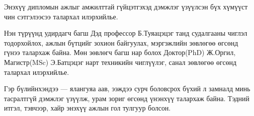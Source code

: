 
\begin{acknowledgements}
\addchaptertocentry{\acknowledgementname}

Энэхүү дипломын ажлыг амжилттай гүйцэтгэхэд дэмжлэг үзүүлсэн бүх хүмүүст чин сэтгэлээсээ талархал илэрхийлье.

Нэн түрүүнд удирдагч багш Дэд профессор Б.Туяацэцэг танд судалгааны чиглэл тодорхойлох, ажлын бүтцийг зохион байгуулах, мэргэжлийн зөвлөгөө өгсөнд гүнээ талархаж байна. Мөн зөвлөгч багш нар болох Доктор(PhD) Ж.Оргил, Магистр(MSc) Э.Батцэцэг нарт техникийн чиглүүлэг, санал зөвлөгөө өгсөнд талархал илэрхийлье.

Гэр бүлийнхэндээ --- ялангуяа аав, ээждээ сурч боловсрох бүхий л замналд минь тасралтгүй дэмжлэг үзүүлж, урам зориг өгсөнд үнэнхүү талархаж байна. Тэдний итгэл, тэвчээр, хайр энэхүү ажлын гол тулгуур болсон.

\end{acknowledgements}

